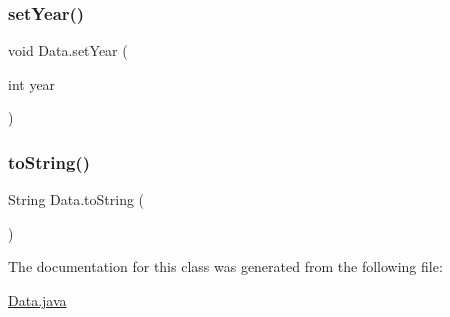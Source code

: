 \hypertarget{class_data_a03a832c4735f73cf7ffd55ab0261c1aa}{}\label{class_data_a03a832c4735f73cf7ffd55ab0261c1aa} 
\subsubsection{\texorpdfstring{set\+Year()}{setYear()}}
{\footnotesize\ttfamily void Data.\+set\+Year (\begin{DoxyParamCaption}\item[{int}]{year }\end{DoxyParamCaption})}

\hypertarget{class_data_a7c190e5a2f3f11629a13a90d05e9e1cf}{}\label{class_data_a7c190e5a2f3f11629a13a90d05e9e1cf} 
\subsubsection{\texorpdfstring{to\+String()}{toString()}}
{\footnotesize\ttfamily String Data.\+to\+String (\begin{DoxyParamCaption}{ }\end{DoxyParamCaption})}



The documentation for this class was generated from the following file\+:\begin{DoxyCompactItemize}
\item 
\hyperlink{_data_8java}{Data.\+java}\end{DoxyCompactItemize}
